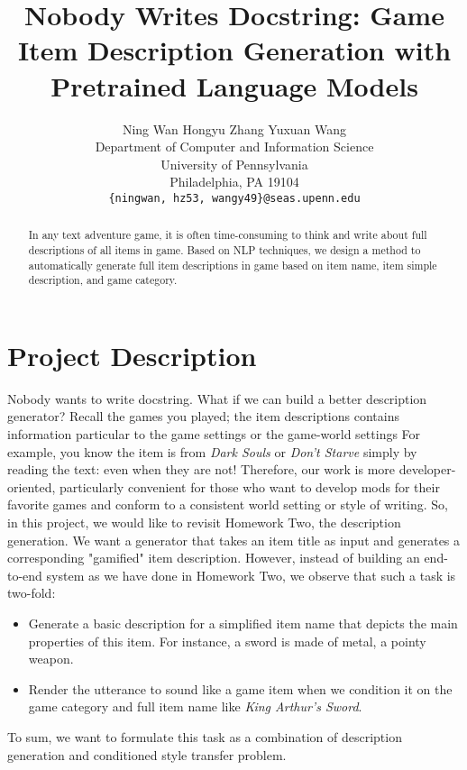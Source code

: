 \documentclass[11pt]{article}
\title{\textbf{Nobody Writes Docstring:} Game Item Description Generation with Pretrained Language Models}
\author{
  Ning Wan \quad
  Hongyu Zhang \quad
  Yuxuan Wang \\
  Department of Computer and Information Science\\
	University of Pennsylvania\\
	Philadelphia, PA 19104 \\
  \texttt{\{ningwan, hz53, wangy49\}@seas.upenn.edu}
 }
\begin{document}


\lstset{style=myStyle}

\maketitle
\begin{abstract}
In any text adventure game, it is often time-consuming to think and write about full descriptions of all items in game. Based on NLP techniques, we design a method to automatically generate full item descriptions in game based on item name, item simple description, and game category.
\end{abstract}

\section{Project Description}
  Nobody wants to write docstring. What if we can build a better description generator? 
    Recall the games you played; the item descriptions contains information particular to 
    the game settings or the game-world settings For example, you know the item is from \textit{Dark Souls} or \textit{Don't Starve} 
    simply by reading the text: even when they are not! Therefore, our work is more 
    developer-oriented, particularly convenient for those who want to develop mods for 
    their favorite games and conform to a consistent world setting or style of writing. So, in this project, 
    we would like to revisit Homework Two, the description generation. 
    We want a generator that takes an item title as input and generates a 
    corresponding "gamified" item description. However, instead of building an 
    end-to-end system as we have done in Homework Two, we observe that such a task 
    is two-fold:
    \begin{itemize}
      \item Generate a basic description for a simplified item name that depicts the main properties of this item. 
        For instance, a sword is made of metal, a pointy weapon.
      \item Render the utterance to sound like a game item when we condition it on the game category and full 
        item name like \textit{King Arthur's Sword}.
    \end{itemize}
    To sum, we want to formulate this task as a combination of description generation and conditioned style transfer problem.
\end{document}
